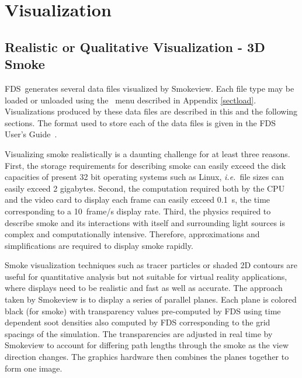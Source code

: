 \documentclass[11pt,twoside]{book}
\newcommand{\FDS}{{FDS}}
\newcommand{\smokeview}{{Smokeview}}
\newcommand{\ie}{{\em i.e.}}
\newcommand{\loadmenu}{\fbox{\tt Load/Unload} }
\begin{document}

\part{Visualization}


\chapter{Realistic or Qualitative Visualization - 3D Smoke}
\FDS\ generates several data files visualized by \smokeview. Each
file type may be loaded or unloaded using the \loadmenu\  menu
described in Appendix \ref{sectload}. Visualizations produced by
these data files are described in this and the following sections.
The format used to store
each of the data files is given in the FDS User's Guide~\cite{FDS_Users_Guide_5}.

Visualizing smoke realistically is a daunting
challenge for at least three reasons. First, the storage
requirements for describing smoke can easily exceed the disk
capacities of present 32 bit operating systems such as Linux, \ie\
file sizes can easily exceed 2 gigabytes. Second, the computation
required both by the CPU and the video card to display each frame
can easily exceed 0.1~s, the time corresponding to a 10~frame/s
display rate. Third, the physics required to describe smoke and
its interactions with itself and surrounding light sources is
complex and computationally intensive. Therefore, approximations
and simplifications are required to display smoke rapidly.

Smoke visualization techniques such as tracer particles or shaded
2D contours are useful for quantitative analysis but not suitable
for virtual reality applications, where displays need to be
realistic and fast as well as accurate. The approach taken by
Smokeview is to display a series of parallel planes.  Each plane
is colored black (for smoke) with transparency values pre-computed
by FDS using time dependent soot densities also computed by FDS
corresponding to the grid spacings of the simulation. The
transparencies are adjusted in real time by Smokeview to account
for differing path lengths through the smoke as the view direction
changes. The graphics hardware then combines the planes together
to form one image.
\end{document}
